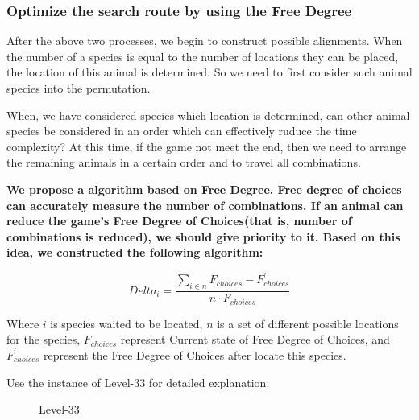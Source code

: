 \documentclass{mcmthesis}
\begin{document}
			\subsubsection{Optimize the search route by using the Free Degree}
			
				After the above two processes, we begin to construct possible alignments. When the number of a species is equal to the number of locations they can be placed, the location of this animal is determined. So we need to first consider such animal species into the permutation.
				
				When, we have considered species which location is determined, can other animal species be considered in an order which can effectively ruduce the time complexity? At this time, if the game not meet the end, then we need to arrange the remaining animals in a certain order and to travel all combinations. 
				
				\textbf{We propose a algorithm based on Free Degree. Free degree of choices can accurately measure the number of combinations. If an animal can reduce the game's Free Degree of Choices(that is, number of combinations is reduced), we should give priority to it. Based on this idea, we constructed the following algorithm:}
				
				\begin{equation}
					Delta_{i} = \frac { \sum _ { i \in n } F_{choices} - F_{choices}^{'} } { n \cdot F_{choices} }
				\end{equation}
				
				Where $i$ is species waited to be located, $n$ is a set of different possible locations for the species, $F_{choices}$ represent Current state of Free Degree of Choices, and  $F_{choices}^{'}$ represent the Free Degree of Choices after locate this species.
				
				Use the instance of Level-33 for detailed explanation:
				
				\begin{figure}[htbp]
					\centering
					\centering
					\caption{Level-33}
				\end{figure}
			
\end{document}
